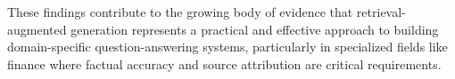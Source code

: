 These findings contribute to the growing body of evidence that retrieval-augmented generation represents a practical and effective approach to building domain-specific question-answering systems, particularly in specialized fields like finance where factual accuracy and source attribution are critical requirements.

